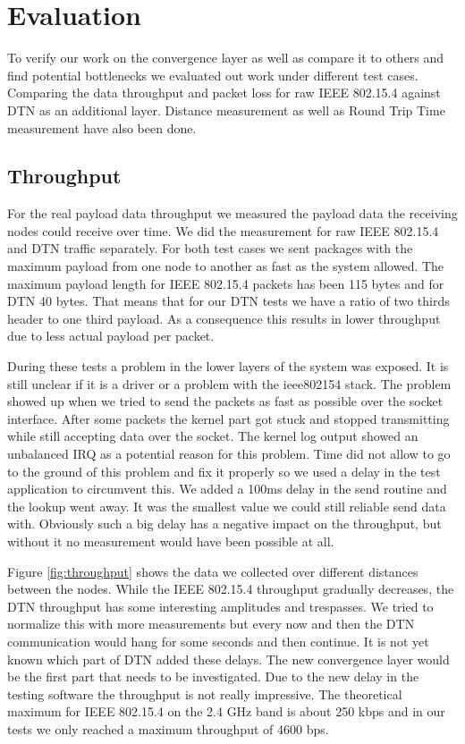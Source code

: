 \chapter{Evaluation}
To verify our work on the convergence layer as well as compare it to others and
find potential bottlenecks we evaluated out work under different test cases.
Comparing the data throughput and packet loss for raw IEEE 802.15.4 against DTN
as an additional layer. Distance measurement as well as Round Trip Time
measurement have also been done.

\section{Throughput}
For the real payload data throughput we measured the payload data the receiving
nodes could receive over time. We did the measurement for raw IEEE 802.15.4 and
DTN traffic separately. For both test cases we sent packages with the maximum
payload from one node to another as fast as the system allowed. The maximum
payload length for IEEE 802.15.4 packets has been 115 bytes and for DTN 40 bytes.
That means that for our DTN tests we have a ratio of two thirds header to one
third payload. As a consequence this results in lower throughput due to less
actual payload per packet.

During these tests a problem in the lower layers of the system was exposed. It is
still unclear if it is a driver or a problem with the ieee802154 stack. The
problem showed up when we tried to send the packets as fast as possible over the
socket interface. After some packets the kernel part got stuck and stopped
transmitting while still accepting data over the socket. The kernel log output
showed an unbalanced IRQ as a potential reason for this problem. Time did not allow
to go to the ground of this problem and fix it properly so we used a delay
in the test application to circumvent this. We added a 100ms delay in the send
routine and the lookup went away. It was the smallest value we could still
reliable send data with. Obviously such a big delay has a negative impact on the
throughput, but without it no measurement would have been possible at all.

Figure \ref{fig:throughput} shows the data we collected over different distances between the
nodes. While the IEEE 802.15.4 throughput gradually decreases, the DTN throughput
has some interesting amplitudes and trespasses. We tried to normalize this with
more measurements but every now and then the DTN communication would hang
for some seconds and then continue. It is not yet known which part of DTN added
these delays. The new convergence layer would be the first part that needs to be
investigated. Due to the new delay in the testing software the throughput is
not really impressive. The theoretical maximum for IEEE 802.15.4 on the 2.4 GHz
band is about 250 kbps and in our tests we only reached a maximum throughput of
4600 bps.

